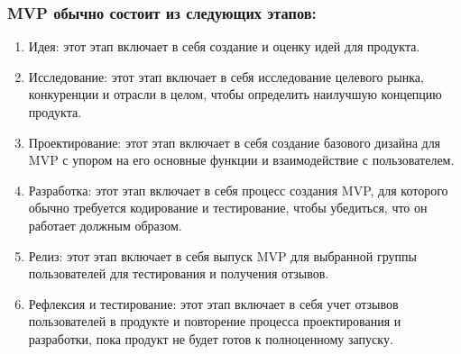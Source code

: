 \documentclass[letterpaper,10pt,russian]{sphinxmanual}
\begin{document}
\subsubsection{MVP обычно состоит из следующих этапов:}
\label{\detokenize{educational_materials/mvp/content:id4}}\begin{enumerate}
%
\item {} 
\sphinxAtStartPar
Идея: этот этап включает в себя создание и оценку идей для продукта.

\item {} 
\sphinxAtStartPar
Исследование: этот этап включает в себя исследование целевого рынка, конкуренции и отрасли в целом, чтобы определить наилучшую концепцию продукта.

\item {} 
\sphinxAtStartPar
Проектирование: этот этап включает в себя создание базового дизайна для MVP с упором на его основные функции и взаимодействие с пользователем.

\item {} 
\sphinxAtStartPar
Разработка: этот этап включает в себя процесс создания MVP, для которого обычно требуется кодирование и тестирование, чтобы убедиться, что он работает должным образом.

\item {} 
\sphinxAtStartPar
Релиз: этот этап включает в себя выпуск MVP для выбранной группы пользователей для тестирования и получения отзывов.

\item {} 
\sphinxAtStartPar
Рефлексия и тестирование: этот этап включает в себя учет отзывов пользователей в продукте и повторение процесса проектирования и разработки, пока продукт не будет готов к полноценному запуску.

\end{enumerate}
\end{document}
